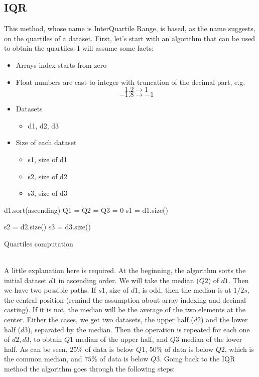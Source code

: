 \documentclass[12pt]{report}
\begin{document}
\subsection{IQR}
This method, whose name is InterQuartile Range, is based, as the name suggests, on the quartiles of a dataset. First, let's start with an algorithm that can be used to obtain the quartiles. I will assume some facts:
\begin{itemize}
    \item Arrays index starts from zero
    \item Float numbers are cast to integer with truncation of the decimal part, e.g.
    $$1.2 \to 1$$
    $$-1.8 \to -1$$
    \item Datasets
    \begin{itemize}
        \item d1, d2, d3
    \end{itemize}
    \item Size of each dataset
    \begin{itemize}
        \item s1, size of d1
        \item s2, size of d2
        \item s3, size of d3
    \end{itemize}
\end{itemize}

\begin{algorithm}[H]
\SetAlgoLined
{}
d1.sort(ascending)\;
Q1 = Q2 = Q3 = 0\;
s1 = d1.size()\;

s2 = d2.size()\;
s3 = d3.size()\;
 \caption{Quartiles computation}
\end{algorithm}
\noindent \\A little explanation here is required. At the beginning, the algorithm sorts the initial dataset $d1$ in ascending order. We will take the median ($Q2$) of $d1$. Then we have two possible paths. If $s1$, size of $d1$, is odd, then the median is at $1/2s$, the central position (remind the assumption about array indexing and decimal casting). If it is not, the median will be the average of the two elements at the center. Either the cases, we get two datasets, the upper half ($d2$) and the lower half ($d3$), separated by the median. Then the operation is repeated for each one of $d2,d3$, to obtain $Q1$ median of the upper half, and $Q3$ median of the lower half. As can be seen, $25\%$ of data is below $Q1$, $50\%$ of data is below $Q2$, which is the common median, and $75\%$ of data is below $Q3$. 
\clearpage 
\noindent Going back to the IQR method the algorithm goes through the following steps:
\end{document}
